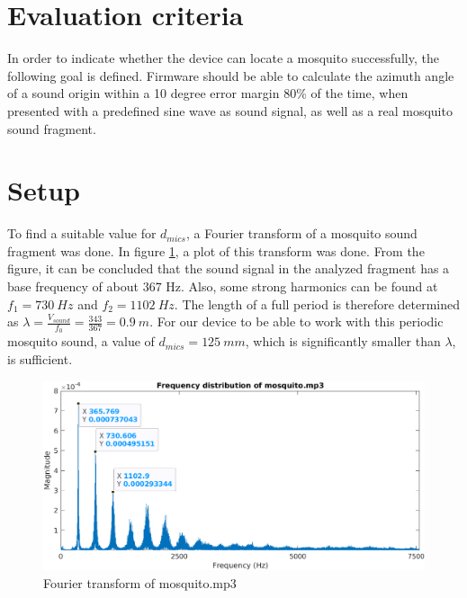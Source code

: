 \documentclass[a4paper]{article}
\begin{document}
\section{Evaluation criteria}
In order to indicate whether the device can locate a mosquito successfully, the following goal is defined. Firmware should be able to calculate the azimuth angle of a sound origin within a 10 degree error margin 80\% of the time, when presented with a predefined sine wave as sound signal, as well as a real mosquito sound fragment.

\section{Setup}

To find a suitable value for $d_{mics}$, a Fourier transform of a mosquito sound fragment \cite{mosquito_fragment} was done. In figure \ref{fig:mosquito_fourier}, a plot of this transform was done. From the figure, it can be concluded that the sound signal in the analyzed fragment has a base frequency of about $367$ Hz. Also, some strong harmonics can be found at $f_1 = 730\ Hz$ and $f_2 = 1102\ Hz$. The length of a full period is therefore determined as $\lambda = \frac{V_{sound}}{f_0} = \frac{343}{367} = 0.9\ m$. For our device to be able to work with this periodic mosquito sound, a value of $d_{mics} = 125\ mm$, which is significantly smaller than $\lambda$, is sufficient.

\begin{figure}[H]
    \includegraphics[width=34em]{assets/mosquito_fourier.png}
    \caption{Fourier transform of mosquito.mp3}
    \label{fig:mosquito_fourier}
\end{figure}
\end{document}
